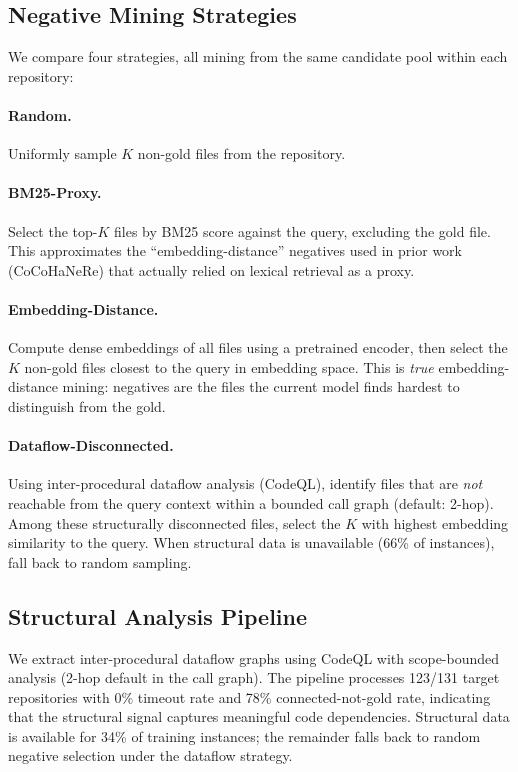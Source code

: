 \documentclass[11pt]{article}
\begin{document}
\subsection{Negative Mining Strategies}

We compare four strategies, all mining from the same candidate pool within each repository:

\paragraph{Random.} Uniformly sample $K$ non-gold files from the repository.

\paragraph{BM25-Proxy.} Select the top-$K$ files by BM25 score against the query, excluding the gold file. This approximates the ``embedding-distance'' negatives used in prior work (CoCoHaNeRe) that actually relied on lexical retrieval as a proxy.

\paragraph{Embedding-Distance.} Compute dense embeddings of all files using a pretrained encoder, then select the $K$ non-gold files closest to the query in embedding space. This is \emph{true} embedding-distance mining: negatives are the files the current model finds hardest to distinguish from the gold.

\paragraph{Dataflow-Disconnected.} Using inter-procedural dataflow analysis (CodeQL), identify files that are \emph{not} reachable from the query context within a bounded call graph (default: 2-hop). Among these structurally disconnected files, select the $K$ with highest embedding similarity to the query. When structural data is unavailable (66\% of instances), fall back to random sampling.

\subsection{Structural Analysis Pipeline}

We extract inter-procedural dataflow graphs using CodeQL with scope-bounded analysis (2-hop default in the call graph).
The pipeline processes 123/131 target repositories with 0\% timeout rate and 78\% connected-not-gold rate, indicating that the structural signal captures meaningful code dependencies.
Structural data is available for 34\% of training instances; the remainder falls back to random negative selection under the dataflow strategy.
\end{document}
